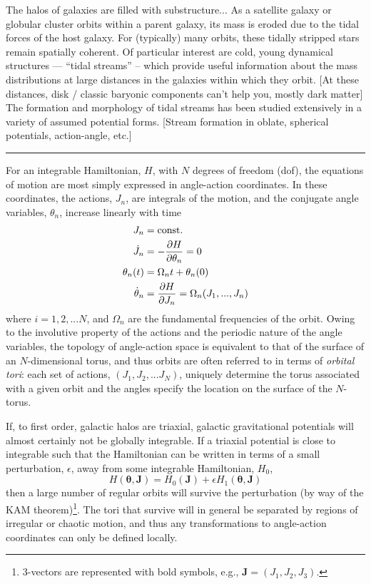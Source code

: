 \documentclass[letterpaper,12pt,preprint]{aastex}
\newcommand{\bs}[1]{\boldsymbol{#1}}
\newcommand{\act}{J}
\begin{document}
The halos of galaxies are filled with substructure...
As a satellite galaxy or globular cluster orbits within a parent galaxy, its mass is eroded due to the tidal forces of the host galaxy. For (typically) many orbits, these tidally stripped stars remain spatially coherent.
Of particular interest are cold, young dynamical structures --- ``tidal streams'' -- which provide useful information about the mass distributions at large distances in the galaxies within which they orbit. [At these distances, disk / classic baryonic components can't help you, mostly dark matter]
The formation and morphology of tidal streams has been studied extensively in a variety of assumed potential forms. [Stream formation in oblate, spherical potentials, action-angle, etc.]

\hrule

For an integrable Hamiltonian, $H$, with $N$ degrees of freedom (dof), the equations of motion are most simply expressed in angle-action coordinates. In these coordinates, the actions, $J_n$, are integrals of the motion, and the conjugate angle variables, $\theta_n$, increase linearly with time
\begin{align}
	\act_n &= {\rm const.}\\
	\dot{\act}_n &= -\frac{\partial H}{\partial \theta_n} = 0\\
	\theta_n(t) &= \Omega_n t + \theta_n(0)\\
	\dot{\theta}_n &= \frac{\partial H}{\partial \act_n} = \Omega_n(\act_1,...,\act_n)\label{eq:aafreq}
\end{align}
where $i=1,2,...N$, and $\Omega_n$ are the fundamental frequencies of the orbit. Owing to the involutive property of the actions and the periodic nature of the angle variables, the topology of angle-action space is equivalent to that of the surface of an $N$-dimensional torus, and thus orbits are often referred to in terms of \emph{orbital tori}: each set of actions, $(\act_1,\act_2,...\act_N)$, uniquely determine the torus associated with a given orbit and the angles specify the location on the surface of the $N$-torus.

If, to first order, galactic halos are triaxial, galactic gravitational potentials will almost certainly not be globally integrable. If a triaxial potential is close to integrable such that the Hamiltonian can be written in terms of a small perturbation, $\epsilon$, away from some integrable Hamiltonian, $H_0$,
\begin{equation}
	H(\bs{\theta}, \bs{\act}) = H_0(\bs{\act}) + \epsilon H_1(\bs{\theta}, \bs{\act})
\end{equation}
then a large number of regular orbits will survive the perturbation (by way of the KAM theorem)\footnote{3-vectors are represented with bold symbols, e.g., $\bs{J}=(J_1,J_2,J_3)$.}. The tori that survive will in general be separated by regions of irregular or chaotic motion, and thus any transformations to angle-action coordinates can only be defined locally. 
\end{document}
